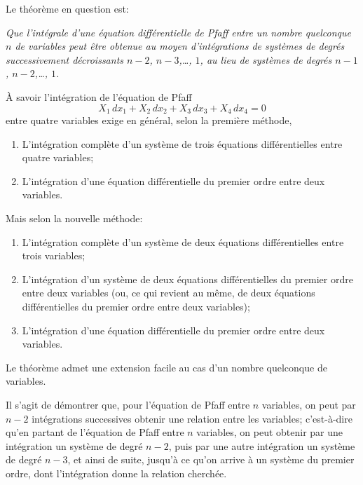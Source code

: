 \documentclass[11pt,a4paper]{book}
\begin{document}
Le th\'{e}or\`{e}me en question est:\medskip

\textit{Que l'int\'{e}grale d'une \'{e}quation diff\'{e}rentielle de Pfaff entre un nombre
quelconque $n$ de variables peut \^{e}tre obtenue au moyen d'int\'{e}grations de
syst\`{e}mes de degr\'{e}s successivement d\'{e}croissants $n-2$, $n-3$,\ldots, $1$, au
lieu de syst\`{e}mes de degr\'{e}s $n-1$, $n-2$,\ldots, $1$.}
\medskip

\`{A} savoir l'int\'{e}gration de l'\'{e}quation de Pfaff
\[X_{1}\,dx_{1} + X_{2}\,dx_{2} + X_{3}\,dx_{3} + X_{4}\,dx_{4} = 0\]
entre quatre variables exige en g\'{e}n\'{e}ral, selon la premi\`{e}re m\'{e}thode,

\begin{enumerate}[label=\arabic*.]
\item L'int\'{e}gration compl\`{e}te d'un syst\`{e}me de trois \'{e}quations diff\'{e}rentielles
entre quatre variables;
\item L'int\'{e}gration d'une \'{e}quation diff\'{e}rentielle du premier ordre entre deux variables.
\end{enumerate}

Mais selon la nouvelle m\'{e}thode:
\begin{enumerate}[label=\arabic*.]
\item L'int\'{e}gration compl\`{e}te d'un syst\`{e}me de deux \'{e}quations diff\'{e}rentielles
entre trois variables;
\item L'int\'{e}gration d'un syst\`{e}me de deux \'{e}quations diff\'{e}rentielles du premier
ordre entre deux variables (ou, ce qui revient au m\^{e}me, de deux \'{e}quations
diff\'{e}rentielles du premier ordre entre deux variables);
\item L'int\'{e}gration d'une \'{e}quation diff\'{e}rentielle du premier ordre entre deux variables.
\end{enumerate}

Le th\'{e}or\`{e}me admet une extension facile au cas d'un nombre quelconque de variables.

Il s'agit de d\'{e}montrer que, pour l'\'{e}quation de Pfaff entre $n$ variables, on peut
par $n-2$ int\'{e}grations successives obtenir une relation entre les variables; c'est-\`{a}-dire
qu'en partant de l'\'{e}quation de Pfaff entre $n$ variables, on peut obtenir par une
int\'{e}gration un syst\`{e}me de degr\'{e} $n-2$, puis par une autre int\'{e}gration un syst\`{e}me
de degr\'{e} $n-3$, et ainsi de suite, jusqu'\`{a} ce qu'on arrive \`{a} un syst\`{e}me du premier
ordre, dont l'int\'{e}gration donne la relation cherch\'{e}e.
\end{document}
